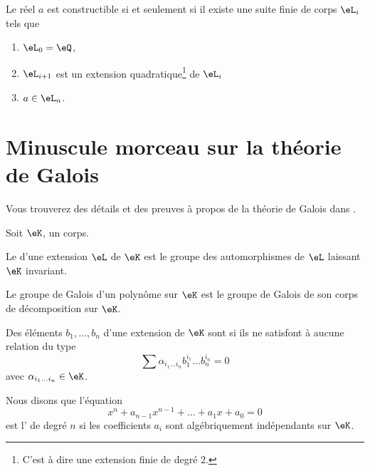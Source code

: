 \begin{theorem}
    Le réel \( a\) est constructible si et seulement si il existe une suite finie de corps \( \eL_i\) tels que
    \begin{enumerate}
        \item
            \( \eL_0=\eQ\),
        \item
            \( \eL_{i+1}\) est un extension quadratique\footnote{C'est à dire une extension finie de degré \( 2\).} de \( \eL_i\)
        \item
            \( a\in \eL_n\).
    \end{enumerate}
\end{theorem}

\section{Minuscule morceau sur la théorie de Galois}

Vous trouverez des détails et des preuves à propos de la théorie de Galois dans \cite{GalIEl}.

\begin{definition}
    Soit $\eK$, un corps.
    
    Le  d'une extension \( \eL\) de \( \eK\) est le groupe des automorphismes de \( \eL\) laissant \( \eK\) invariant. 

    Le groupe de Galois d'un polynôme sur \( \eK\) est le groupe de Galois de son corps de décomposition sur \( \eK\).
\end{definition}

\begin{definition}
    Des éléments \( b_1,\ldots, b_n\) d'une extension de \( \eK\) sont  si ils ne satisfont à aucune relation du type
    \begin{equation}
        \sum \alpha_{i_1\ldots i_n}b_1^{i_1}\ldots b_n^{i_n}=0
    \end{equation}
    avec \( \alpha_{i_1\ldots i_n}\in \eK\).
\end{definition}

Nous disons que l'équation
\begin{equation}
    x^n+a_{n-1}x^{n-1}+\ldots+a_1x+a_0=0
\end{equation}
est l' de degré \( n\) si les coefficients \( a_i\) sont algébriquement indépendants sur \( \eK\).

